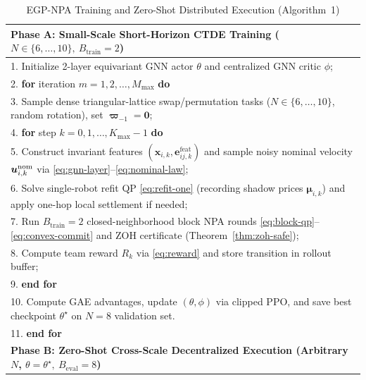 \begin{table}[htbp]
 \centering\footnotesize
 \caption{EGP-NPA Training and Zero-Shot Distributed Execution (Algorithm~1)}\label{tab:algo1}
 \renewcommand{\arraystretch}{1.10}
 \begin{tabularx}{\columnwidth}{@{}X@{}}
 \toprule
 \textbf{Phase A: Small-Scale Short-Horizon CTDE Training ($N\in\{6,\dots,10\},\ B_{\mathrm{train}}=2$)}\\
 \midrule
 1. Initialize 2-layer equivariant GNN actor $\theta$ and centralized GNN critic $\phi$;\\
 2. \textbf{for} iteration $m=1,2,\dots,M_{\max}$ \textbf{do}\\
 3. \hspace{0.8em}Sample dense triangular-lattice swap/permutation tasks ($N\in\{6,\dots,10\}$, random rotation), set $\boldsymbol\varpi_{-1}=\boldsymbol 0$;\\
 4. \hspace{0.8em}\textbf{for} step $k=0,1,\dots,K_{\max}-1$ \textbf{do}\\
 5. \hspace{1.6em}Construct invariant features $(\boldsymbol x_{i,k},\boldsymbol e_{ij,k}^{\mathrm{feat}})$ and sample noisy nominal velocity $\boldsymbol{u}_{i,k}^{\mathrm{nom}}$ via \eqref{eq:gnn-layer}--\eqref{eq:nominal-law};\\
 6. \hspace{1.6em}Solve single-robot refit QP \eqref{eq:refit-one} (recording shadow prices $\boldsymbol\mu_{i,k}$) and apply one-hop local settlement if needed;\\
 7. \hspace{1.6em}Run $B_{\mathrm{train}}=2$ closed-neighborhood block NPA rounds \eqref{eq:block-qp}--\eqref{eq:convex-commit} and ZOH certificate (Theorem~\ref{thm:zoh-safe});\\
 8. \hspace{1.6em}Compute team reward $R_k$ via \eqref{eq:reward} and store transition in rollout buffer;\\
 9. \hspace{0.8em}\textbf{end for}\\
 10. \hspace{0.4em}Compute GAE advantages, update $(\theta,\phi)$ via clipped PPO, and save best checkpoint $\theta^\star$ on $N=8$ validation set.\\
 11. \textbf{end for}\\
 \midrule
 \textbf{Phase B: Zero-Shot Cross-Scale Decentralized Execution (Arbitrary $N$, $\theta=\theta^\star,\ B_{\mathrm{eval}}=8$)}\\

\end{tabularx}
\end{table}
